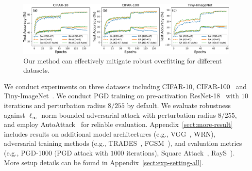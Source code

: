 




\begin{figure}[t]
  \centering
  \includegraphics[width=0.98\linewidth]{figures/mitigate-overfitting.pdf}
  \vspace{-1ex}
  \caption{Our method can effectively mitigate robust overfitting for different datasets. 
  }
\label{fig:mitigate-overfitting}
\end{figure}


We conduct experiments on three datasets including CIFAR-10, CIFAR-100~\citep{Krizhevsky2009LearningML} and Tiny-ImageNet~\citep{Le2015TinyIV}. We conduct PGD training on pre-activation ResNet-18~\citep{He2016IdentityMI} with $10$ iterations and perturbation radius $8/255$ by default. We evaluate robustness against $\ell_\infty$ norm-bounded adversarial attack with perturbation radius $8/255$, and employ AutoAttack~\citep{Croce2020ReliableEO} for reliable evaluation.  
Appendix~\ref{sect:more-result} includes results on additional model architectures (e.g., VGG~\citep{Simonyan2015VeryDC}, WRN),  adversarial training methods (e.g., TRADES~\citep{Zhang2019TheoreticallyPT}, FGSM~\citep{Goodfellow2015ExplainingAH}), and evaluation metrics (e.g., PGD-1000 (PGD attack with $1000$ iterations), Square Attack~\citep{Andriushchenko2020SquareAA}, RayS~\citep{Chen2020RaySAR}). More setup details can be found in Appendix~\ref{sect:exp-setting-all}.

